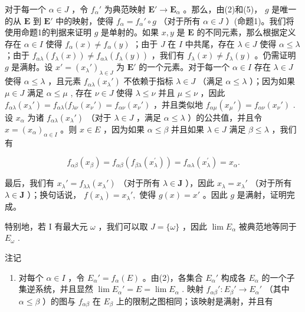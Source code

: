 对于每一个 \(\alpha \in J\) ，令 \(f_{\alpha}'\) 为典范映射 \(\mathbf{E}' \to \mathbf{E}_{\alpha}\) 。那么，由(2)和(5)， \(g\) 是唯一的从 \(\mathbf{E}\) 到 \(\mathbf{E}'\) 中的映射，使得 \(f_{\alpha} = f_{\alpha}' \circ g\) （对于所有 \(\alpha \in J\) ）(命题1)。我们将使用命题1的判据来证明 \(g\) 是单射的。如果 \(x, y\) 是 \(\mathbf{E}\) 的不同元素，那么根据定义存在 \(\alpha \in I\) 使得 \(f_{\alpha}(x) \neq f_{\alpha}(y)\) ；由于 \(J\) 在 \(I\) 中共尾，存在 \(\lambda \in J\) 使得 \(\alpha \leqslant \lambda\) ；由于 \(f_{\alpha\lambda}(f_{\lambda}(x)) \neq f_{\alpha\lambda}(f_{\lambda}(y))\) ，我们有 \(f_{\lambda}(x) \neq f_{\lambda}(y)\) 。仍需证明 \(g\) 是满射。设 \(x' = (x_{\lambda}')_{\lambda \in J}\) 为 \(\mathbf{E}'\) 的一个元素。对于每一个 \(\alpha \in I\) 存在 \(\lambda \in J\) 使得 \(\alpha \leqslant \lambda\) ，且元素 \(f_{\alpha\lambda}(x_{\lambda}')\) 不依赖于指标 \(\lambda \in J\) （满足 \(\alpha \leqslant \lambda\) ）；因为如果 \(\mu \in J\) 满足 \(\alpha \leqslant \mu\) , 存在 \(\nu \in J\) 使得 \(\lambda \leqslant \nu\) 并且 \(\mu \leqslant \nu\) ，因此 \(f_{\alpha\lambda}(x_{\lambda}') = f_{\alpha\lambda}(f_{\lambda\nu}(x_{\nu}') = f_{\alpha\nu}(x_{\nu}')\) ，并且类似地 \(f_{\alpha\mu}(x_{\mu}') = f_{\alpha\nu}(x_{\nu}')\) . 设 \(x_{\alpha}\) 为诸 \(f_{\alpha\lambda}(x_{\lambda}')\) （对于 \(\lambda \in J\) ，满足 \(\alpha \leqslant \lambda\) ）的公共值，并且令 \(x = (x_{\alpha})_{\alpha \in I}\) 。则 \(x \in E\) ，因为如果 \(\alpha \leqslant \beta\) 并且如果 \(\lambda \in J\) 满足 \(\beta \leqslant \lambda\) ，我们有

\[
f _ {\alpha \beta} (x _ {\beta}) = f _ {\alpha \beta} (f _ {\beta \lambda} (x _ {\lambda} ^ {\prime})) = f _ {\alpha \lambda} (x _ {\lambda} ^ {\prime}) = x _ {\alpha}.
\]

最后，我们有 \(x_{\lambda}' = f_{\lambda \lambda}(x_{\lambda}')\) （对于所有 \(\lambda \in \mathbf{J}\) ），因此 \(x_{\lambda} = x_{\lambda}'\) （对于所有 \(\lambda \in \mathbf{J}\) ）；换句话说， \(f(x_{\lambda}) = x_{\lambda}',\) 使得 \(g(x) = x'\) 。因此 \(g\) 是满射，证明完成。

特别地，若 I 有最大元 \(\omega\) ，我们可以取 \(J = \{\omega\}\) ，因此 \(\lim E_{\alpha}\) 被典范地等同于 \(E_{\omega}\) .

注记

\begin{enumerate}
\def\labelenumi{(\arabic{enumi})}
\tightlist
\item
  对每个 \(\alpha \in I\) ，令 \(E_{\alpha}' = f_{\alpha}(E)\) 。由(2)，各集合 \(E_{\alpha}'\) 构成各 \(E_{\alpha}\) 的一个子集逆系统，并且显然 \(\lim E_{\alpha}' = E = \lim E_{\alpha}\) . 映射 \(f_{\alpha\beta}' : E_{\beta}' \to E_{\alpha}'\) （其中 \(\alpha \leqslant \beta\) ）的图与 \(f_{\alpha\beta}\) 在 \(E_{\beta}\) 上的限制之图相同；该映射是满射，并且有
\end{enumerate}

